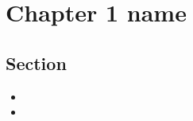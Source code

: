 \chapter{Chapter 1 name}






\section{Section}
\begin{itemize}
    \item  
    \item  
    
\end{itemize}
